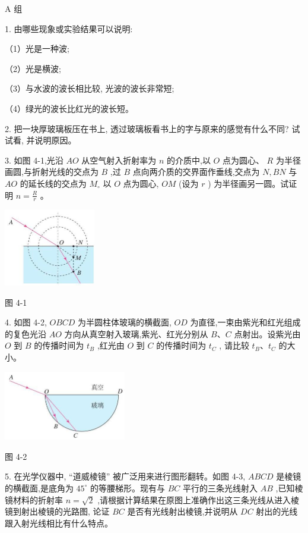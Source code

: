 \documentclass[10pt]{article}
\begin{document}
A 组

1. 由哪些现象或实验结果可以说明:

（1）光是一种波;

（2）光是横波;

（3）与水波的波长相比较, 光波的波长非常短;

（4）绿光的波长比红光的波长短。

2. 把一块厚玻璃板压在书上, 透过玻璃板看书上的字与原来的感觉有什么不同? 试试看, 并说明原因。

3. 如图 4-1,光沿 \({AO}\) 从空气射入折射率为 \(n\) 的介质中,以 \(O\) 点为圆心、 \(R\) 为半径画圆,与折射光线的交点为 \(B\) ,过 \(B\) 点向两介质的交界面作垂线,交点为 \(N,{BN}\) 与 \({AO}\) 的延长线的交点为 \({M}_{ \circ }\) 以 \(O\) 点为圆心, \({OM}\) (设为 \(r\) ) 为半径画另一圆。试证明 \(n = \frac{R}{r}\) 。

\begin{center}
\includegraphics[max width=0.3\textwidth]{images/01910e4c-ebb8-7d2c-8f2f-2375bc1d2d12_119_349396.jpg}
\end{center}

图 4-1

4. 如图 4-2, \({OBCD}\) 为半圆柱体玻璃的横截面, \({OD}\) 为直径,一束由紫光和红光组成的复色光沿 \({AO}\) 方向从真空射入玻璃,紫光、红光分别从 \(B\text{、}C\) 点射出。设紫光由 \(O\) 到 \(B\) 的传播时间为 \({t}_{B}\) ,红光由 \(O\) 到 \(C\) 的传播时间为 \({t}_{C}\) , 请比较 \({t}_{B}\text{、}{t}_{C}\) 的大小。

\begin{center}
\includegraphics[max width=0.4\textwidth]{images/01910e4c-ebb8-7d2c-8f2f-2375bc1d2d12_119_175704.jpg}
\end{center}

图 4-2

5. 在光学仪器中, “道威棱镜” 被广泛用来进行图形翻转。如图 4-3, \({ABCD}\) 是棱镜的横截面,是底角为 \({45}^{ \circ }\) 的等腰梯形。现有与 \({BC}\) 平行的三条光线射入 \({AB}\) ,已知棱镜材料的折射率 \(n = \sqrt{2}\) ,请根据计算结果在原图上准确作出这三条光线从进入棱镜到射出棱镜的光路图, 论证 \({BC}\) 是否有光线射出棱镜,并说明从 \({DC}\) 射出的光线跟入射光线相比有什么特点。
\end{document}
